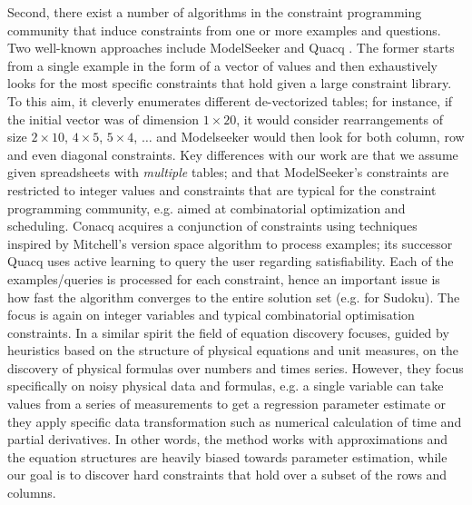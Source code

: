 Second, there exist a number of algorithms in the constraint programming community that induce constraints from one or more examples and questions. Two well-known approaches include ModelSeeker \cite{modelseeker} and Quacq \cite{Quacq}.
The former starts from a single example in the form of a vector of values and then exhaustively looks for the most specific constraints that hold given a large constraint library. To this aim, it cleverly enumerates different de-vectorized tables; for instance, if the initial vector was of dimension $1 \times 20$, it would consider rearrangements of size $2 \times 10$, $4 \times 5$, $5 \times 4$, $\dots$ and Modelseeker would then look for both column, row  and even diagonal constraints. Key differences with our work are that we assume given spreadsheets with \textit{multiple} tables; and that ModelSeeker's constraints are restricted to integer values and constraints that are typical for the constraint programming community, e.g. aimed at combinatorial optimization and scheduling. Conacq \cite{Conacq} acquires a conjunction of constraints using techniques inspired by Mitchell's version space algorithm to process examples; its successor Quacq uses active learning to query the user regarding satisfiability. Each of the examples/queries is processed for each constraint, hence an important issue is how fast the algorithm converges to the entire solution set (e.g. for Sudoku).
The focus is again on integer variables and typical combinatorial optimisation constraints. In a similar spirit the field of equation discovery \cite{equation_discovery} focuses, guided by  heuristics based on the structure of physical equations and unit measures, on the discovery of physical formulas over numbers and times series.
However, they focus specifically on noisy physical data and formulas, e.g. a single variable can take values from a series of measurements to get a regression parameter estimate or they apply specific data transformation such as numerical calculation of time and partial derivatives. In other words, the method works with approximations and the equation structures are heavily biased towards parameter estimation, while our goal is to discover hard constraints that hold over a subset of the rows and columns.



